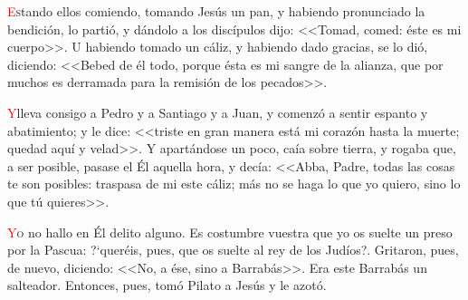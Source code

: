 \documentclass[10pt,twoside]{book}
\begin{document}


\vspace{1.5em}

\noindent{}
\lettrine[lines=2]{\textcolor{red}{E}}stando ellos comiendo, tomando Jesús un pan, y habiendo pronunciado la bendición, lo partió, y dándolo a los discípulos dijo: <<Tomad, comed: éste es mi cuerpo>>.
U habiendo tomado un cáliz, y habiendo dado gracias, se lo dió, diciendo: <<Bebed de él todo, porque ésta es mi sangre de la alianza, que por muchos es derramada para la remisión de los pecados>>.

\vspace{0.5em}

{} 

\vspace{0.5em}

\iralfinal

\vspace{1.5em}

\noindent{}

\vspace{4mm}

\noindent{}
\lettrine[lines=2]{\textcolor{red}{Y}}\space lleva consigo a Pedro y a Santiago y a Juan, y comenzó a sentir espanto y abatimiento; y le dice: <<triste en gran manera está mi corazón hasta la muerte;
quedad aquí y velad>>. Y apartándose un poco, caía sobre tierra, y rogaba que, a ser posible, pasase el Él aquella hora, y decía: <<Abba, Padre, todas las cosas te son posibles:
traspasa de mi este cáliz; más no se haga lo que yo quiero, sino lo que tú quieres>>.

\vspace{0.5em}



\vspace{1.5em}

\noindent{}
\lettrine[lines=2, ante=\guillemotleft]{\textcolor{red}{Y}}o no hallo en Él delito alguno. Es costumbre vuestra que yo os suelte un preso por la Pascua: {?`}queréis, 
pues, que os suelte al rey de los Judíos?\guillemotright. Gritaron, pues, de nuevo, diciendo: <<No, a ése, sino a Barrabás>>. 
Era este Barrabás un salteador. Entonces, pues, tomó Pilato a Jesús y le azotó.
\end{document}
